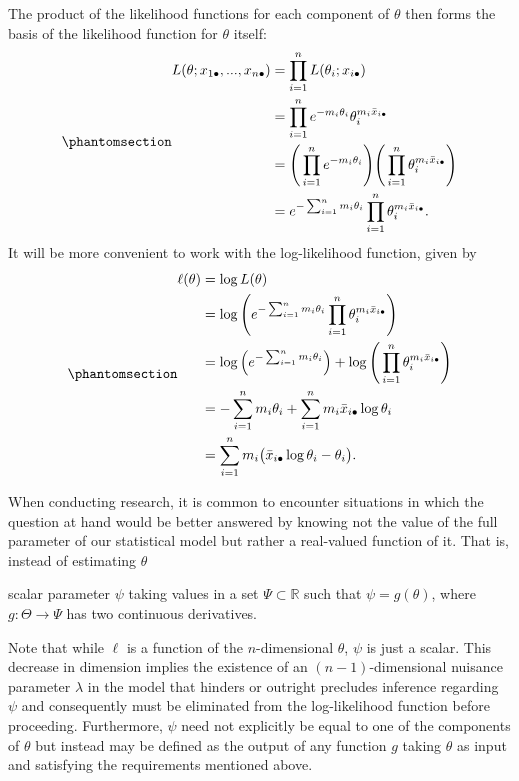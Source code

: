 \documentclass[
  12pt]{article}
\begin{document}
The product of the likelihood functions for each component of \(\theta\)
then forms the basis of the likelihood function for \(\theta\) itself:
\begin{equation}\phantomsection\label{eq-4}{
\begin{aligned}
L(\theta; x_{1\bullet}, ..., x_{n\bullet}) &= \prod_{i=1}^n L(\theta_i; x_{i\bullet}) \\
                                           &= \prod_{i=1}^n e^{-m_i\theta_i}\theta_i^{m_i\bar{x}_{i\bullet}} \\
                                           &= \Bigg(\prod_{i=1}^n e^{-m_i\theta_i}\Bigg) \Bigg(\prod_{i=1}^n \theta_i^{m_i\bar{x}_{i\bullet}}\Bigg) \\
                                           &= e^{-\sum_{i=1}^n m_i\theta_i}\prod_{i=1}^n \theta_i^{m_i\bar{x}_{i\bullet}}.
\end{aligned}
}\end{equation} It will be more convenient to work with the
log-likelihood function, given by
\begin{equation}\phantomsection\label{eq-4}{
\begin{aligned}
\ell(\theta) &= \log L(\theta) \\
             &= \log \Bigg(e^{-\sum_{i=1}^n m_i\theta_i}\prod_{i=1}^n \theta_i^{m_i\bar{x}_{i\bullet}} \Bigg) \\
             &= \log \Big(e^{-\sum_{i=1}^n m_i\theta_i}\Big) + \log \Bigg(\prod_{i=1}^n \theta_i^{m_i\bar{x}_{i\bullet}} \Bigg) \\
             &= -\sum_{i=1}^n m_i\theta_i + \sum_{i=1}^n m_i\bar{x}_{i\bullet} \log\theta_i \\
             &= \sum_{i=1}^n m_i\big(\bar{x}_{i\bullet} \log\theta_i - \theta_i \big).
\end{aligned}
}\end{equation}

When conducting research, it is common to encounter situations in which
the question at hand would be better answered by knowing not the value
of the full parameter of our statistical model but rather a real-valued
function of it. That is, instead of estimating \(\theta\)

scalar parameter \(\psi\) taking values in a set
\(\Psi \subset \mathbb{R}\) such that \(\psi = g(\theta)\), where
\(g: \Theta \to \Psi\) has two continuous derivatives.

Note that while \(\ell\) is a function of the \(n\)-dimensional
\(\theta\), \(\psi\) is just a scalar. This decrease in dimension
implies the existence of an \((n-1)\)-dimensional nuisance parameter
\(\lambda\) in the model that hinders or outright precludes inference
regarding \(\psi\) and consequently must be eliminated from the
log-likelihood function before proceeding. Furthermore, \(\psi\) need
not explicitly be equal to one of the components of \(\theta\) but
instead may be defined as the output of any function \(g\) taking
\(\theta\) as input and satisfying the requirements mentioned above.
\end{document}
